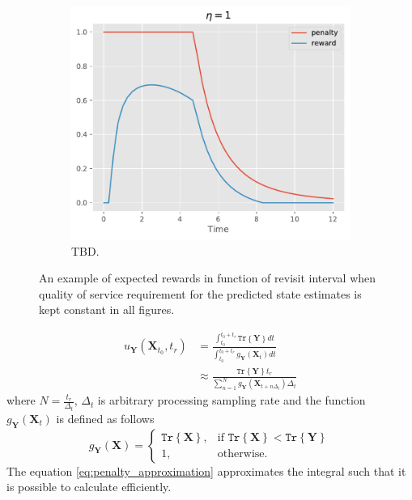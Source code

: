 \documentclass[english, 12pt, a4paper, elec, utf8, a-1b, online]{aaltothesis}
\newcommand{\tr}[1]{\texttt{Tr}\left\{ #1 \right\}}
\renewcommand{\vec}[1]{\mathbf{#1}}
\begin{document}
\begin{figure}[h]
\begin{subfigure}[b]{0.45\textwidth}
    \end{subfigure}
    \begin{subfigure}[b]{0.45\textwidth}
        \centering
        \includegraphics[width=\textwidth]{figures/rl_formulation/reward_10.pdf}
        \caption{ TBD.}
    \end{subfigure}
    \caption{An example of expected rewards in function of revisit interval when quality of service requirement for the predicted state estimates is kept constant in all figures.}
    \label{fig:my_label}
\end{figure}

\newcommand{\X}{\vec{X}}
\newcommand{\Y}{\vec{Y}}
\begin{align}
    u_\Y(\X_{t_0}, t_r)
    &= \frac{\int_{t_0}^{t_0+t_r} \tr{\Y} dt}{\int_{t_0}^{t_0+t_r}  g_\Y(\X_t) dt} \\
    &\approx \frac{\tr{\Y} t_r}{\sum_{n=1}^{N} g_\Y(\X_{t+n\Delta_t}) \Delta_t} \label{eq:penalty_approximation}
\end{align}
where $N=\frac{t_r}{\Delta_t}$, $\Delta_t$ is arbitrary processing sampling rate  and the function $g_\Y(\X_t)$ is defined as follows
\begin{equation}
    g_\Y(\X) =
    \left\{
    \begin{array}{ll}
        \tr{\X}, & \text{if } \tr{\X} < \tr{\Y} \\
        1, & \text{otherwise.}
    \end{array}
    \right.
\end{equation}
The equation \eqref{eq:penalty_approximation} approximates the integral such that it is possible to calculate efficiently.
\end{document}
